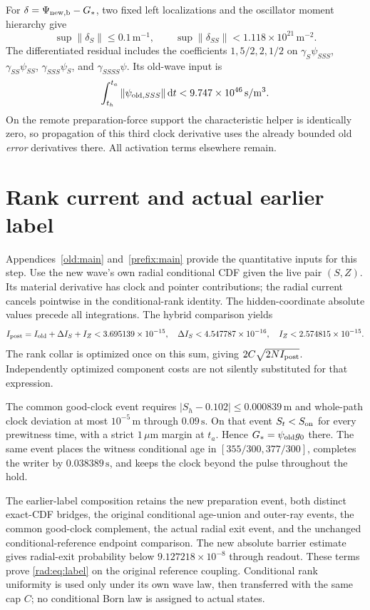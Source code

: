 \documentclass[11pt]{article}
\theoremstyle{definition}\newtheorem{definition}[theorem]{Definition}
\theoremstyle{remark}\newtheorem{remark}[theorem]{Remark}
\newcommand{\dd}{\,\mathrm d}\newcommand{\Imv}{\operatorname{Im}}\newcommand{\ii}{\mathrm i}
\begin{document}
For $\delta=\Psi_{\rm new,b}-G_*$, two fixed left localizations and the
oscillator moment hierarchy give
\[
 \sup\|\delta_S\|\leq0.1\,\mathrm m^{-1},\qquad
 \sup\|\delta_{SS}\|<1.118\times10^{21}\,\mathrm m^{-2}.
\]
The differentiated residual includes the coefficients $1,5/2,2,1/2$
on $\gamma_S\psi_{SSS}$, $\gamma_{SS}\psi_{SS}$,
$\gamma_{SSS}\psi_S$, and $\gamma_{SSSS}\psi$. Its old-wave input is
\[
 \int_{t_h}^{t_a}\|\psi_{{\rm old},SSS}\|\dd t
                <9.747\times10^{46}\,\mathrm{s/m^3}.
\]
On the remote preparation-force support the characteristic helper is
identically zero, so propagation of this third clock derivative uses
the already bounded old \emph{error} derivatives there. All activation
terms elsewhere remain.

\section{Rank current and actual earlier label}

Appendices~\ref{old:main} and~\ref{prefix:main} provide the quantitative
inputs for this step. Use the new wave's own radial conditional CDF given the live pair
$(S,Z)$. Its material derivative has clock and pointer contributions;
the radial current cancels pointwise in the conditional-rank identity.
The hidden-coordinate absolute values precede all integrations. The
hybrid comparison yields
\[
 I_{\rm post}=I_{\rm old}+\Delta I_S+I_Z
       <3.695139\times10^{-15},\quad
 \Delta I_S<4.547787\times10^{-16},\quad
 I_Z<2.574815\times10^{-15}.
\]
The rank collar is optimized once on this sum, giving
$2C\sqrt{2NI_{\rm post}}$. Independently optimized component costs
are not silently substituted for that expression.

The common good-clock event requires
$|S_h-0.102|\leq0.000839\,\mathrm m$ and whole-path clock deviation
at most $10^{-5}\,\mathrm m$ through $0.09\,\mathrm s$.
On that event $S_t<S_{\rm on}$ for every prewitness time, with a strict
$1\,\mu\mathrm m$ margin at $t_a$. Hence $G_*=\psi_{\rm old}g_0$
there. The same event places the witness conditional age in
$[355/300,377/300]$, completes the writer by $0.038389\,\mathrm s$,
and keeps the clock beyond the pulse throughout the hold.

The earlier-label composition retains the new preparation event, both
distinct exact-CDF bridges, the original conditional age-union and
outer-ray events, the common good-clock complement, the actual radial
exit event, and the unchanged conditional-reference endpoint comparison.
The new absolute barrier estimate gives radial-exit probability below
$9.127218\times10^{-8}$ through readout. These terms prove
\eqref{rad:eq:label} on the original reference coupling. Conditional rank
uniformity is used only under its own wave law, then transferred with
the same cap $C$; no conditional Born law is assigned to actual states.
\end{document}
